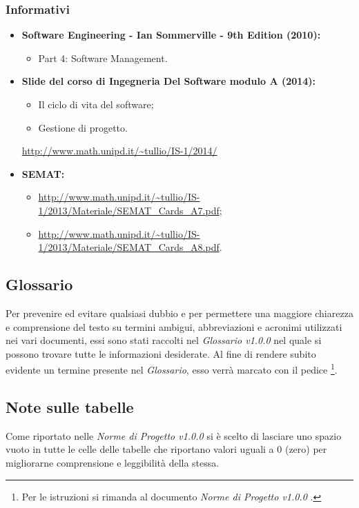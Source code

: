 \subsubsection{Informativi}
\label{sezione 1.2.2}
\begin{itemize}
	\item \textbf{Software Engineering - Ian Sommerville - 9th Edition (2010):} 
	\begin{itemize}
		\item Part 4: Software Management.
	\end{itemize}
	\item \textbf{\gls{Slide} del corso di Ingegneria Del Software modulo A (2014):} 
	\begin{itemize}
		\item Il ciclo di vita del software; 
		\item Gestione di progetto.
	\end{itemize}
	\url{http://www.math.unipd.it/~tullio/IS-1/2014/}
	\item \textbf{\gls{SEMAT}:}
	\begin{itemize}
		\item \url{http://www.math.unipd.it/~tullio/IS-1/2013/Materiale/SEMAT_Cards_A7.pdf};
		\item \url{http://www.math.unipd.it/~tullio/IS-1/2013/Materiale/SEMAT_Cards_A8.pdf}.	
	\end{itemize}
\end{itemize}

\subsection{Glossario}
Per prevenire ed evitare qualsiasi dubbio e per permettere una maggiore chiarezza e comprensione del testo su termini ambigui, abbreviazioni e acronimi utilizzati nei vari documenti, essi sono stati raccolti nel \textit{Glossario v1.0.0} nel quale si possono trovare tutte le informazioni desiderate.
Al fine di rendere subito evidente un termine presente nel \textit{Glossario}, esso verrà marcato con il pedice \G\footnote{Per le istruzioni si rimanda al documento \textit{Norme di Progetto v1.0.0} .}.

\subsection{Note sulle tabelle}
Come riportato nelle \textit{Norme di Progetto v1.0.0} si è scelto di lasciare uno spazio vuoto in tutte le celle delle tabelle che riportano valori uguali a 0 (zero) per migliorarne comprensione e leggibilità della stessa.

